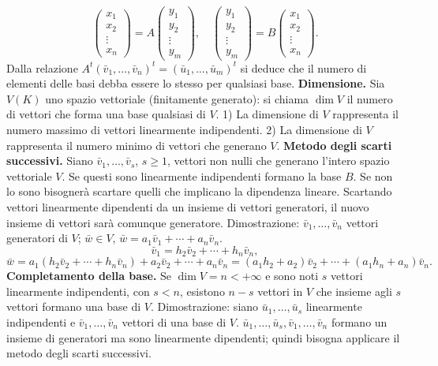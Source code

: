 \documentclass[11pt,a4paper]{article}
\newcommand{\pagina}[1]{\clearpage}
\begin{document}
\[\begin{pmatrix}x_1\\x_2\\\vdots\\x_n\end{pmatrix}=A\begin{pmatrix}y_1\\y_2\\\vdots\\y_m\end{pmatrix},\quad\begin{pmatrix}y_1\\y_2\\\vdots\\y_m\end{pmatrix}=B\begin{pmatrix}x_1\\x_2\\\vdots\\x_n\end{pmatrix}.\]
Dalla relazione $A^t(\bar v_1,\ldots,\bar v_n)^t=(\bar u_1,\ldots,\bar u_m)^t$ si deduce che il numero di elementi delle basi debba essere lo stesso per qualsiasi base.
\textbf{Dimensione.} Sia $V(K)$ uno spazio vettoriale (finitamente generato): si chiama $\dim V$ il numero di vettori che forma una base qualsiasi di $V$.
1) La dimensione di $V$ rappresenta il numero massimo di vettori linearmente indipendenti.
2) La dimensione di $V$ rappresenta il numero minimo di vettori che generano $V$.
\textbf{Metodo degli scarti successivi.} Siano $\bar v_1,\ldots,\bar v_s$, $s\ge1$, vettori non nulli che generano l'intero spazio vettoriale $V$. Se questi sono linearmente indipendenti formano la base $B$. Se non lo sono bisognerà scartare quelli che implicano la dipendenza lineare. Scartando vettori linearmente dipendenti da un insieme di vettori generatori, il nuovo insieme di vettori sarà comunque generatore.
\pagina{35}
Dimostrazione: $\bar v_1,\ldots,\bar v_n$ vettori generatori di $V$; $\bar w\in V$, $\bar w=a_1\bar v_1+\cdots+a_n\bar v_n$.
\[\bar v_1=h_2\bar v_2+\cdots+h_n\bar v_n,\]
\[\bar w=a_1(h_2\bar v_2+\cdots+h_n\bar v_n)+a_2\bar v_2+\cdots+a_n\bar v_n=(a_1h_2+a_2)\bar v_2+\cdots+(a_1h_n+a_n)\bar v_n.\]
\textbf{Completamento della base.} Se $\dim V=n<+\infty$ e sono noti $s$ vettori linearmente indipendenti, con $s<n$, esistono $n-s$ vettori in $V$ che insieme agli $s$ vettori formano una base di $V$.
Dimostrazione: siano $\bar u_1,\ldots,\bar u_s$ linearmente indipendenti e $\bar v_1,\ldots,\bar v_n$ vettori di una base di $V$. $\bar u_1,\ldots,\bar u_s,\bar v_1,\ldots,\bar v_n$ formano un insieme di generatori ma sono linearmente dipendenti; quindi bisogna applicare il metodo degli scarti successivi.
\end{document}
